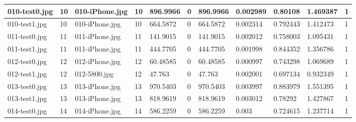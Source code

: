 \begin{landscape}
\begin{longtable}{|p{2cm}|p{1cm}|p{2cm}|p{1cm}|p{2cm}|p{1cm}|p{2cm}|p{2cm}|p{2cm}|p{2cm}|p{1cm}|}
		010-test0.jpg   & 10               & 010-iPhone.jpg        & 10                          & 896.9966              & 0                       & 896.9966                   & 0.002989              & 0.80108               & 1.469387                 & 1                \\ \hline
		010-test1.jpg   & 10               & 010-iPhone.jpg        & 10                          & 664.5872              & 0                       & 664.5872                   & 0.002314              & 0.792443              & 1.412473                 & 1                \\ \hline
		011-test0.jpg   & 11               & 011-iPhone.jpg        & 11                          & 141.9015              & 0                       & 141.9015                   & 0.002012              & 0.758003              & 1.095431                 & 1                \\ \hline
		011-test1.jpg   & 11               & 011-iPhone.jpg        & 11                          & 444.7705              & 0                       & 444.7705                   & 0.001998              & 0.844352              & 1.356786                 & 1                \\ \hline
		012-test0.jpg   & 12               & 012-iPhone.jpg        & 12                          & 60.48585              & 0                       & 60.48585                   & 0.000997              & 0.743298              & 1.069689                 & 1                \\ \hline
		012-test1.jpg   & 12               & 012-5800.jpg          & 12                          & 47.763                & 0                       & 47.763                     & 0.002001              & 0.697134              & 0.932349                 & 1                \\ \hline
		013-test0.jpg   & 13               & 013-iPhone.jpg        & 13                          & 970.5403              & 0                       & 970.5403                   & 0.003997              & 0.883979              & 1.551395                 & 1                \\ \hline
		013-test1.jpg   & 13               & 013-iPhone.jpg        & 13                          & 818.9619              & 0                       & 818.9619                   & 0.003012              & 0.78292               & 1.427867                 & 1                \\ \hline
		014-test0.jpg   & 14               & 014-iPhone.jpg        & 14                          & 586.2259              & 0                       & 586.2259                   & 0.003                 & 0.724615              & 1.237714                 & 1                \\ \hline

\end{longtable}
\end{landscape}
